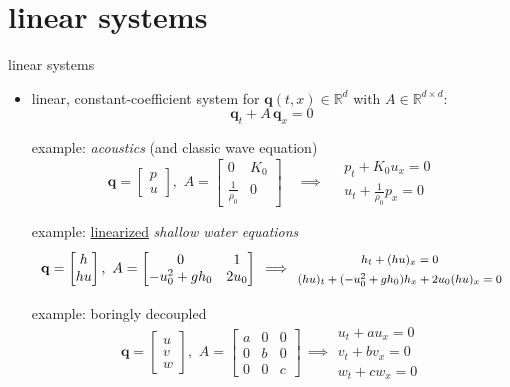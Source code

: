 \documentclass[10pt,hyperref,dvipsnames]{beamer}
\newcommand{\bq}{\mathbf{q}}
\newcommand{\RR}{\mathbb{R}}
\begin{document}
\section{linear systems}

\begin{frame}{linear systems}

\begin{itemize}
\item linear, constant-coefficient system for $\bq(t,x) \in \RR^d$ with $A\in\RR^{d\times d}$:
  $$\bq_t + A\, \bq_x=0$$

\setlength{\itemindent}{11mm}
\item[example:] \emph{acoustics} (and classic wave equation)
        $$\bq = \begin{bmatrix} p \\ u \end{bmatrix}, \,\, A = \begin{bmatrix} 0 & K_0 \\ \frac{1}{\rho_0} & 0 \end{bmatrix} \quad \implies \quad \begin{matrix} p_t + K_0 u_x = 0 \\ u_t + \frac{1}{\rho_0} p_x = 0 \end{matrix}$$
\item[example:] \underline{linearized} \emph{shallow water equations}
        $$\bq = \begin{bmatrix} h \\ h u \end{bmatrix}, \,\, A = \begin{bmatrix} 0 & 1 \\ -u_0^2+gh_0 & 2 u_0 \end{bmatrix} \, \implies \, {\footnotesize \begin{matrix} {\large \strut} h_t + (hu)_x = 0 \\ {\large \strut} (h u)_t + (-u_0^2+gh_0) h_x + 2u_0 (h u)_x = 0 \end{matrix} }$$
\item[example:] boringly decoupled
        $$\bq = \begin{bmatrix} u \\ v \\ w \end{bmatrix}, \,\, A = \begin{bmatrix} a & 0 & 0 \\ 0 & b & 0 \\ 0 & 0 & c \end{bmatrix} \, \implies \begin{matrix} u_t + a u_x = 0 \\ v_t + b v_x = 0 \\ w_t + c w_x = 0 \end{matrix}$$
\end{itemize}
\end{frame}
\end{document}

